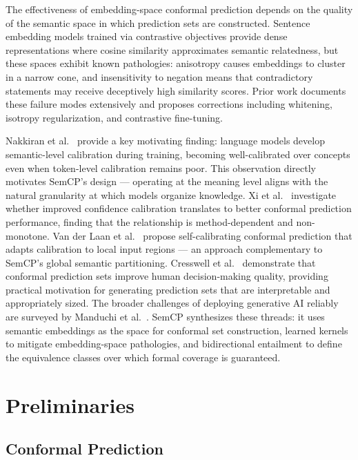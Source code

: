 \documentclass{article}
\begin{document}
\label{sec:semantic_representations_and_calibration}

The effectiveness of embedding-space conformal prediction depends on the quality of the semantic space in which prediction sets are constructed. Sentence embedding models trained via contrastive objectives provide dense representations where cosine similarity approximates semantic relatedness, but these spaces exhibit known pathologies: anisotropy causes embeddings to cluster in a narrow cone, and insensitivity to negation means that contradictory statements may receive deceptively high similarity scores. Prior work documents these failure modes extensively and proposes corrections including whitening, isotropy regularization, and contrastive fine-tuning.

Nakkiran et al.\ \cite{nakkiran2025trained} provide a key motivating finding: language models develop semantic-level calibration during training, becoming well-calibrated over concepts even when token-level calibration remains poor. This observation directly motivates SemCP's design --- operating at the meaning level aligns with the natural granularity at which models organize knowledge. Xi et al.\ \cite{xi2024confidence} investigate whether improved confidence calibration translates to better conformal prediction performance, finding that the relationship is method-dependent and non-monotone. Van der Laan et al.\ \cite{laan2024selfcalibrating} propose self-calibrating conformal prediction that adapts calibration to local input regions --- an approach complementary to SemCP's global semantic partitioning. Cresswell et al.\ \cite{cresswell2024conformal} demonstrate that conformal prediction sets improve human decision-making quality, providing practical motivation for generating prediction sets that are interpretable and appropriately sized. The broader challenges of deploying generative AI reliably are surveyed by Manduchi et al.\ \cite{manduchi2024challenges}. SemCP synthesizes these threads: it uses semantic embeddings as the space for conformal set construction, learned kernels to mitigate embedding-space pathologies, and bidirectional entailment to define the equivalence classes over which formal coverage is guaranteed.

\section{Preliminaries}

\label{sec:preliminaries}

\subsection{Conformal Prediction}
\end{document}

